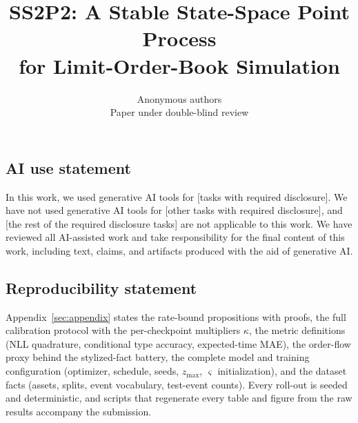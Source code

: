 \documentclass{article} %
\title{SS2P2: A Stable State-Space Point Process \\ for Limit-Order-Book Simulation}
\author{Anonymous authors\\
Paper under double-blind review}
\begin{document}
\maketitle









\subsection*{AI use statement}
In this work, we used generative AI tools for [tasks with required disclosure].
We have not used generative AI tools for [other tasks with required
disclosure], and [the rest of the required disclosure tasks] are not
applicable to this work. We have reviewed all AI-assisted work and take
responsibility for the final content of this work, including text, claims,
and artifacts produced with the aid of generative AI.

\subsection*{Reproducibility statement}
Appendix~\ref{sec:appendix} states the rate-bound propositions with proofs,
the full calibration protocol with the per-checkpoint multipliers $\kappa$,
the metric definitions (NLL quadrature, conditional type accuracy,
expected-time MAE), the order-flow proxy behind the stylized-fact battery,
the complete model and training configuration (optimizer, schedule, seeds,
$z_{\max}$, $\varsigma$ initialization), and the dataset facts (assets,
splits, event vocabulary, test-event counts). Every roll-out is seeded and
deterministic, and scripts that regenerate every table and figure from the
raw results accompany the submission.




\appendix

\end{document}

